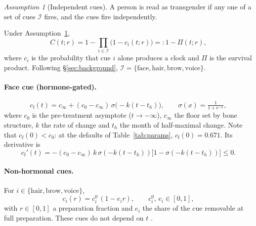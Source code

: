 \documentclass[11pt,a4paper]{article}
\theoremstyle{remark}
\newtheorem{assumption}{Assumption}
\newcommand{\cface}{c_{\mathrm{f}}}
\begin{document}
\begin{assumption}[Independent cues]\label{ass:indep}
A person is read as transgender if any one of a set of cues $\mathcal{I}$ fires, and the cues fire independently.
\end{assumption}

Under Assumption~\ref{ass:indep},
\begin{equation}
  C(t;r) = 1 - \prod_{i\in\mathcal{I}}\bigl(1-c_i(t;r)\bigr) =: 1 - \Pi(t;r), \label{eq:C}
\end{equation}
where $c_i$ is the probability that cue $i$ alone produces a clock and $\Pi$ is the survival product. Following \S\ref{sec:background}, $\mathcal{I}=\{\mathrm{face},\mathrm{hair},\mathrm{brow},\mathrm{voice}\}$.

\paragraph{Face cue (hormone-gated).}
\begin{equation}
  \cface(t) = c_\infty + (c_0-c_\infty)\,\sigma\!\bigl(-k(t-t_h)\bigr), \qquad \sigma(x)=\tfrac{1}{1+e^{-x}}, \label{eq:cface}
\end{equation}
where $c_0$ is the pre-treatment asymptote ($t\to-\infty$), $c_\infty$ the floor set by bone structure, $k$ the rate of change and $t_h$ the month of half-maximal change. Note that $\cface(0)<c_0$: at the defaults of Table~\ref{tab:params}, $\cface(0)=0.671$. Its derivative is
\begin{equation}
  \cface'(t) = -(c_0-c_\infty)\,k\,\sigma(-k(t-t_h))\bigl[1-\sigma(-k(t-t_h))\bigr]\le 0. \label{eq:dcface}
\end{equation}

\paragraph{Non-hormonal cues.} For $i\in\{\mathrm{hair},\mathrm{brow},\mathrm{voice}\}$,
\begin{equation}
  c_i(r) = c_i^0\,(1-e_i r), \qquad c_i^0,\,e_i\in[0,1], \label{eq:ci}
\end{equation}
with $r\in[0,1]$ a preparation fraction and $e_i$ the share of the cue removable at full preparation. These cues do not depend on $t$ \cite{hembree2017,davies2015}.
\end{document}
